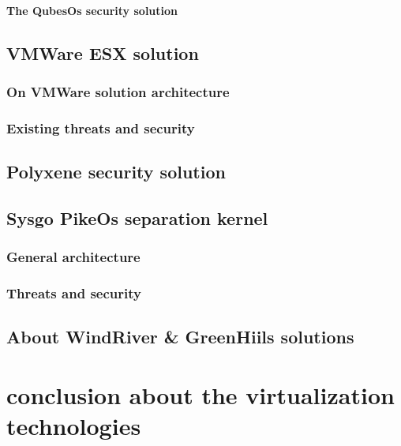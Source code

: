 
\paragraph{The QubesOs security solution}

\subsection{VMWare ESX solution}

\subsubsection{On VMWare solution architecture}

\subsubsection{Existing threats and security}

\subsection{Polyxene security solution}

\subsection{Sysgo PikeOs separation kernel}

\subsubsection{General architecture}

\subsubsection{Threats and security}

\subsection{About WindRiver \& GreenHiils solutions}

\section{conclusion about the virtualization technologies}
